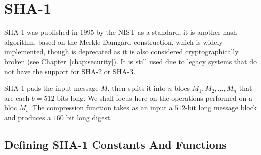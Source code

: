 \section{SHA-1}
\textsc{SHA-1} was published in 1995 by the NIST as a standard, it is another hash algorithm, based on the Merkle-Damg\r{a}rd construction, which is widely implemented, though is deprecated as it is also considered cryptographically broken (see Chapter~\ref{chap:security}). It is still used due to legacy systems that do not have the support for SHA-2 or SHA-3.

SHA-1 pads the input message $M$, then splits it into $n$ blocs $M_1, M_2, {\ldots} ,M_n$ that are each $b=512$ bits long.
We shall focus here on the operations performed on a bloc $M_i$.
The compression function takes as an input a $512$-bit long message block and produces a $160$ bit long digest.

\subsection{Defining SHA-1 Constants And Functions}

